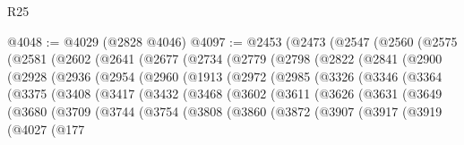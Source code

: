 \begin{lexlean}{R25}
\begin{coremodule}
@4048 := @4029 (@2828 @4046)
@4097 := @2453
    (@2473
      (@2547
        (@2560
          (@2575
            (@2581
              (@2602
                (@2641
                  (@2677
                    (@2734
                      (@2779
                        (@2798
                          (@2822
                            (@2841
                              (@2900
                                (@2928
                                  (@2936
                                    (@2954
                                      (@2960
                                        (@1913
                                          (@2972
                                            (@2985
                                              (@3326
                                                (@3346
                                                  (@3364
                                                    (@3375
                                                      (@3408
                                                        (@3417
                                                          (@3432
                                                            (@3468
                                                              (@3602
                                                                (@3611
                                                                  (@3626
                                                                    (@3631
                                                                      (@3649
                                                                        (@3680
                                                                          (@3709
                                                                            (@3744
                                                                              (@3754
                                                                                (@3808
                                                                                  (@3860
                                                                                    (@3872
                                                                                      (@3907
                                                                                        (@3917
                                                                                          (@3919
                                                                                            (@4027
                                                                                              (@177

\end{coremodule}
\end{lexlean}
